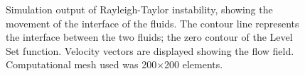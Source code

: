 \begin{figure}
\caption{Simulation output of Rayleigh-Taylor instability, showing the movement of the interface of the fluids. The contour line represents the interface between the two fluids; the zero contour of the Level Set function. Velocity vectors are displayed showing the flow field. Computational mesh used was 200$\times$200 elements.}
\label{RT2D OUTPUT1}
\end{figure}

